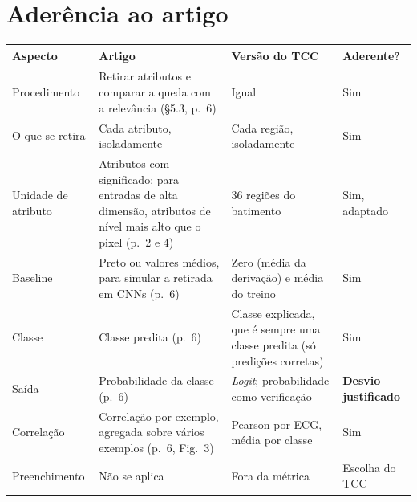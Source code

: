 \documentclass[11pt,a4paper]{article}
\begin{document}
\section{Aderência ao artigo}
\begin{center}\small
\begin{tabularx}{\linewidth}{lXXl}
\toprule
\textbf{Aspecto} & \textbf{Artigo} & \textbf{Versão do TCC} & \textbf{Aderente?} \\
\midrule
Procedimento & Retirar atributos e comparar a queda com a relevância (§5.3, p.~6) & Igual & Sim \\
\addlinespace
O que se retira & Cada atributo, isoladamente & Cada região, isoladamente & Sim \\
\addlinespace
Unidade de atributo & Atributos com significado; para entradas de alta dimensão, atributos de nível mais alto que o pixel (p.~2 e 4) & 36 regiões do batimento & Sim, adaptado \\
\addlinespace
Baseline & Preto ou valores médios, para simular a retirada em CNNs (p.~6) & Zero (média da derivação) e média do treino & Sim \\
\addlinespace
Classe & Classe predita (p.~6) & Classe explicada, que é sempre uma classe predita (só predições corretas) & Sim \\
\addlinespace
Saída & Probabilidade da classe (p.~6) & \textit{Logit}; probabilidade como verificação & \textbf{Desvio justificado} \\
\addlinespace
Correlação & Correlação por exemplo, agregada sobre vários exemplos (p.~6, Fig.~3) & Pearson por ECG, média por classe & Sim \\
\addlinespace
Preenchimento & Não se aplica & Fora da métrica & Escolha do TCC \\
\bottomrule
\end{tabularx}
\end{center}
\end{document}
